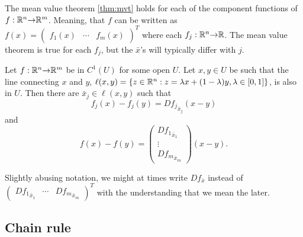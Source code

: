 The mean value theorem \ref{thm:mvt} holds for each of the component
functions of $f:\mathbb{R}^n {\rightarrow} \mathbb{R}^m$. Meaning, that $f$ can be written as
$f(x) = \begin{pmatrix} f_1(x) & \cdots & f_m(x) \end{pmatrix}^T$
where each $f_j:\mathbb{R}^n {\rightarrow} \mathbb{R}$. The mean value theorem is true for each
$f_j$, but the $\bar{x}$'s will typically differ with $j$.
\begin{corollary}\label{thm:mvtm}
  Let $f:\mathbb{R}^n {\rightarrow} \mathbb{R}^m$ be in $C^1(U)$ for some open $U$. Let
  $x, y
  \in U$ be such that the line connecting $x$ and
  $y$, $\ell(x,y) =
  \{z\in \mathbb{R}^n: z = \lambda x + (1-\lambda) y, \lambda \in [0,1]\}$, is
  also in $U$. Then there are $\bar{x}_j \in \ell(x,y)$ such that
  \[ f_j(x) - f_j(y) = D{f_j}_{\bar{x}_j} (x-y) \]
  and
  \[ f(x) - f(y) = \begin{pmatrix} D{f_1}_{\bar{x}_1} \\
    \vdots \\
    D{f_m}_{\bar{x}_m} \end{pmatrix} (x-y). 
  \]  
\end{corollary}
Slightly abusing notation, we might at times write $Df_{\bar{x}}$
instead of $\begin{pmatrix} D{f_1}_{\bar{x}_1} & \cdots &
  D{f_m}_{\bar{x}_m} \end{pmatrix}^T$ with the understanding that we
mean the later.  

\subsection{Chain rule}

